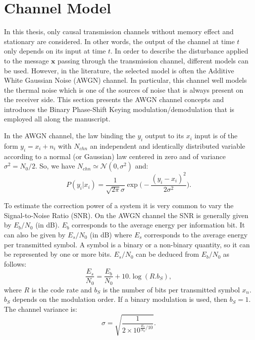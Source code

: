 \section{Channel Model}
\label{sec:ctx_awgn}

In this thesis, only causal transmission channels without memory effect and
stationary are considered. In other words, the output of the channel at time $t$
only depends on its input at time $t$. In order to describe the disturbance
applied to the message $\bm{x}$ passing through the transmission channel,
different models can be used. However, in the literature, the selected model is
often the Additive White Gaussian Noise (AWGN) channel. In particular, this
channel well models the thermal noise which is one of the sources of noise
that is always present on the receiver side. This section presents the AWGN
channel concepts and introduces the Binary Phase-Shift Keying
modulation/demodulation that is employed all along the manuscript.

In the AWGN channel, the law binding the $y_i$ output to its $x_i$ input is of
the form $y_i = x_i + n_i$ with $N_{chn}$ an independent and identically
distributed variable according to a normal (or Gaussian) law centered in zero
and of variance $\sigma^2 = N_0 / 2$. So, we have $N_{chn} \simeq \mathcal{N}(0,
\sigma^2)$ and:
\begin{equation}
P(y_i|x_i) = \frac{1}{\sqrt{2\pi}\sigma}\exp{\Big(-\frac{(y_i-x_i)^2}{2\sigma^2}\Big)}.
\end{equation}

To estimate the correction power of a system it is very common to vary the
Signal-to-Noise Ratio (SNR). On the AWGN channel the SNR is generally given by
$E_b/N_0$ (in dB). $E_b$ corresponds to the average energy per information bit.
It can also be given by $E_s/N_0$ (in dB) where $E_s$ corresponds to the average
energy per transmitted symbol. A symbol is a binary or a non-binary quantity, so
it can be represented by one or more bits. $E_s/N_0$ can be deduced from
$E_b/N_0$ as follows:
\begin{equation}
\frac{E_s}{N_0} = \frac{E_b}{N_0} + 10.\log{(R.b_S)},
\end{equation}
where $R$ is the code rate and $b_S$ is the number of bits per transmitted
symbol $x_n$. $b_S$ depends on the modulation order. If a binary modulation is
used, then $b_S = 1$. The channel variance is:
\begin{equation}
\sigma = \sqrt{\frac{1}{2 \times 10^{\frac{E_s}{N_0} / 10}}}.
\end{equation}

